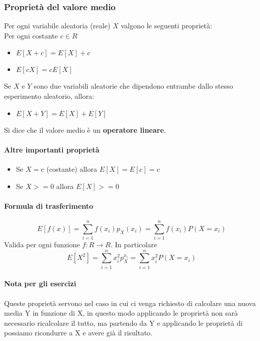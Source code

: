 \subsubsection{Proprietà del valore medio}
Per ogni variabile aleatoria (reale) $X$ valgono le seguenti proprietà:
\\Per ogni costante $c \in R$
\begin{itemize}
    \item $E[X + c] = E[X] + c$
    \item $E[cX] = c E[X]$
\end{itemize}
Se $X$ e $Y$ sono due variabili aleatorie che dipendono entrambe dallo
stesso esperimento aleatorio, allora:
\begin{itemize}
    \item $E[X+Y] = E[X] + E[Y]$
\end{itemize}
Si dice che il valore medio è un\textbf{ operatore lineare}.

\paragraph{Altre importanti proprietà} 
\begin{itemize}
    \item Se $X = c$ (costante) allora $E[X] = E[c] = c$
    \item Se $X >= 0$ allora $E[X] >= 0$
\end{itemize}

\paragraph{Formula di trasferimento} 
\begin{equation}
    E[f(x)] = \sum_{i = 1}^{n} f(x_i)p_X(x_i)
= \sum_{i = 1}^{n}f(x_i)P(X = x_i)
\end{equation}
Valida per ogni funzione $f:R \to R$. In particolare
\begin{equation}
    E[X^2] = \sum_{i = 1}^{n} x_i^2 p_X^{x_i} = \sum_{i = 1}^{n} x_i^2P(X=x_i)
\end{equation}

\paragraph*{Nota per gli esercizi} Queste proprietà servono nel caso in cui ci venga
richiesto di calcolare una nuova media Y in funzione di X, in questo modo applicando
le proprietà non sarà necessario ricalcolare il tutto, ma partendo da Y e applicando
le proprietà di possiamo ricondurre a X e avere già il risultato.

